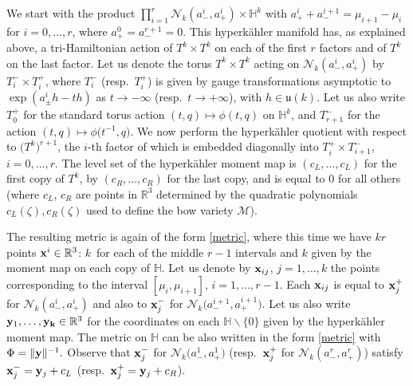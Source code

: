 \documentclass[pdftex]{sigma}
\renewcommand{\u}{{\mathfrak u}}
\numberwithin{equation}{section}
\newcommand{\oH}{{\mathbb{H}}}
\newcommand{\oR}{{\mathbb{R}}}
\newcommand{\sM}{{\mathcal{M}}} %
\newcommand{\sN}{{\mathcal{N}}}
\begin{document}
{ We start with the product $\prod_{i=1}^r\sN_k(a_-^{i},a_+^i) \times \oH^k$ with $a_+^i+a_-^{i+1}=\mu_{i+1}-\mu_i$ for $i=0,\dots,r$, where $a_+^0=a_-^{r+1}=0$. This hyperk\"ahler manifold has, as explained above, a tri-Hamiltonian action of $T^k\times T^k$ on each of the first $r$ factors and of $T^k$ on the last factor. Let us denote the torus $T^k\times T^k$ acting on $\sN_k(a_-^{i},a_+^i)$ by $T_i^-\times T_i^+$, where $T_i^-$ (resp.~$T_i^+$) is given by gauge transformations
 asymptotic to $\exp(a^i_\pm h-th)$ as $t\to -\infty$ (resp.~$t\to +\infty$), with $h\in \u(k)$. Let us also write $T^+_0$ for the standard torus action $(t,q)\mapsto\phi(t,q)$ on $\oH^k$, and $T^-_{r+1}$ for the action $(t,q)\mapsto \phi\big(t^{-1},q\big)$. We now perform the hyperk\"ahler quotient with respect to $\big(T^k\big)^{r+1}$, the $i$-th factor of which is embedded diagonally into $T_i^+\times T_{i+1}^-$,
 $i=0,\dots,r$. The level set of the hyperk\"ahler moment map is $(c_L,\dots,c_L)$ for the first copy of $T^k$, by $(c_R,\dots,c_R)$ for the last copy, and is equal to $0$ for all others (where $c_L$, $c_R$ are points in $\oR^3$ determined by the quadratic polynomials $c_L(\zeta),c_R(\zeta)$ used to define the bow variety $\sM$).

 The resulting metric is again of the form \eqref{metric}, where this time we have $kr$ points ${\bf x}^i\in \oR^3$: $k$~for each of the middle $r-1$ intervals and $k$ given by the moment map on each copy of $\oH$. Let us denote by ${\bf x}_{ij}$, $j=1,\dots,k$ the points corresponding to the interval
 $[\mu_i,\mu_{i+1}]$, $i=1,\dots,r-1$. Each ${\bf x}_{ij}$ is equal to ${\bf x}_j^+$ for $\sN_k(a_-^{i},a_+^i)$ and also to ${\bf x}_j^-$ for $\sN_k\big(a_-^{i+1},a_+^{i+1}\big)$. Let us also write ${\bf y}_1,\dots,{\bf y_k}\in\oR^3$ for the coordinates on each $\oH\backslash\{0\}$ given by the hyperk\"ahler moment map. The metric on $\oH$ can be also written in the form \eqref{metric} with $\Phi=\|{\bf y}\|^{-1}.$ Observe that ${\bf x}_j^-$ for $\sN_k\big(a_-^{1},a_+^1\big)$ (resp.~${\bf x}_j^+$ for $\sN_k(a_-^{r},a_+^r)$) satisfy ${\bf x}_j^-={\bf y}_j+c_L$ (resp.~${\bf x}_j^+={\bf y}_j+c_R$).

}
\end{document}
